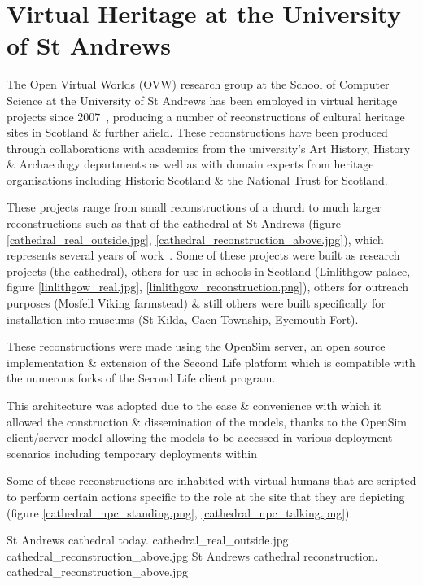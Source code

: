 
\section{Virtual Heritage at the University of St Andrews}
The Open Virtual Worlds (OVW) research group at the School of Computer Science at the University of St Andrews has been employed in virtual heritage projects since 2007~\cite{Getchell2007}, producing a number of reconstructions of cultural heritage sites in Scotland \& further afield. These reconstructions have been produced through collaborations with academics from the university's Art History, History \& Archaeology departments as well as with domain experts from heritage organisations including Historic Scotland \& the National Trust for Scotland.

These projects range from small reconstructions of a church to much larger reconstructions such as that of the cathedral at St Andrews (figure \ref{cathedral_real_outside.jpg}, \ref{cathedral_reconstruction_above.jpg}), which represents several years of work~\cite{Kennedy2013}. Some of these projects were built as research projects (the cathedral), others for use in schools in Scotland (Linlithgow palace, figure \ref{linlithgow_real.jpg}, \ref{linlithgow_reconstruction.png}), others for outreach purposes (Mosfell Viking farmstead) \& still others were built specifically for installation into museums (St Kilda, Caen Township, Eyemouth Fort).


These reconstructions were made using the OpenSim server, an open source implementation \& extension of the Second Life platform which is compatible with the numerous forks of the Second Life client program.

This architecture was adopted due to the ease \& convenience with which it allowed the construction \& dissemination of the models, thanks to the OpenSim client/server model allowing the models to be accessed in various deployment scenarios including temporary deployments within 

Some of these reconstructions are inhabited with virtual humans that are scripted to perform certain actions specific to the role at the site that they are depicting (figure \ref{cathedral_npc_standing.png}, \ref{cathedral_npc_talking.png}).



 {St Andrews cathedral today.} {cathedral_real_outside.jpg}
       {cathedral_reconstruction_above.jpg} {St Andrews cathedral reconstruction.} {cathedral_reconstruction_above.jpg}


